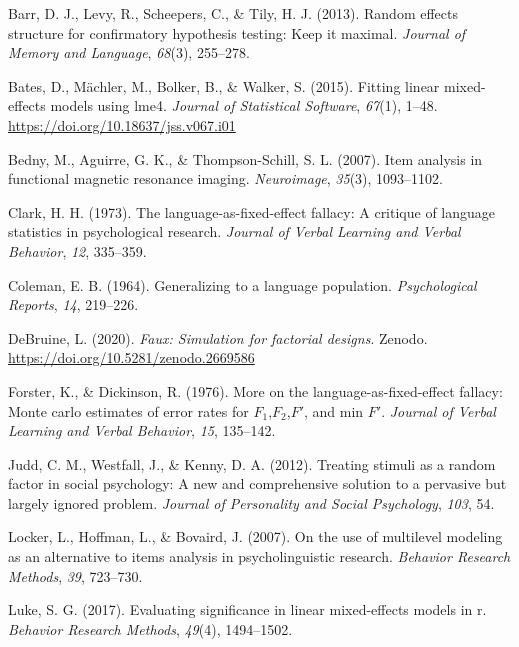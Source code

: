 \documentclass[
  english,
  doc,floatsintext]{apa6}
\begin{document}
\leavevmode\hypertarget{ref-barr_et_al_2013}{}%
Barr, D. J., Levy, R., Scheepers, C., \& Tily, H. J. (2013). Random effects structure for confirmatory hypothesis testing: Keep it maximal. \emph{Journal of Memory and Language}, \emph{68}(3), 255--278.

\leavevmode\hypertarget{ref-R-lme4}{}%
Bates, D., Mächler, M., Bolker, B., \& Walker, S. (2015). Fitting linear mixed-effects models using lme4. \emph{Journal of Statistical Software}, \emph{67}(1), 1--48. \url{https://doi.org/10.18637/jss.v067.i01}

\leavevmode\hypertarget{ref-bedny_aguirre_thompson-schill_2007}{}%
Bedny, M., Aguirre, G. K., \& Thompson-Schill, S. L. (2007). Item analysis in functional magnetic resonance imaging. \emph{Neuroimage}, \emph{35}(3), 1093--1102.

\leavevmode\hypertarget{ref-clark_1973}{}%
Clark, H. H. (1973). The language-as-fixed-effect fallacy: A critique of language statistics in psychological research. \emph{Journal of Verbal Learning and Verbal Behavior}, \emph{12}, 335--359.

\leavevmode\hypertarget{ref-coleman_1964}{}%
Coleman, E. B. (1964). Generalizing to a language population. \emph{Psychological Reports}, \emph{14}, 219--226.

\leavevmode\hypertarget{ref-R-faux}{}%
DeBruine, L. (2020). \emph{Faux: Simulation for factorial designs}. Zenodo. \url{https://doi.org/10.5281/zenodo.2669586}

\leavevmode\hypertarget{ref-forster_dickinson_1976}{}%
Forster, K., \& Dickinson, R. (1976). More on the language-as-fixed-effect fallacy: Monte carlo estimates of error rates for \(F_1\),\(F_2\),\(F'\), and min \(F'\). \emph{Journal of Verbal Learning and Verbal Behavior}, \emph{15}, 135--142.

\leavevmode\hypertarget{ref-judd_westfall_kenny_2012}{}%
Judd, C. M., Westfall, J., \& Kenny, D. A. (2012). Treating stimuli as a random factor in social psychology: A new and comprehensive solution to a pervasive but largely ignored problem. \emph{Journal of Personality and Social Psychology}, \emph{103}, 54.

\leavevmode\hypertarget{ref-locker_hoffman_bovaird_2007}{}%
Locker, L., Hoffman, L., \& Bovaird, J. (2007). On the use of multilevel modeling as an alternative to items analysis in psycholinguistic research. \emph{Behavior Research Methods}, \emph{39}, 723--730.

\leavevmode\hypertarget{ref-luke-2017}{}%
Luke, S. G. (2017). Evaluating significance in linear mixed-effects models in r. \emph{Behavior Research Methods}, \emph{49}(4), 1494--1502.
\end{document}
